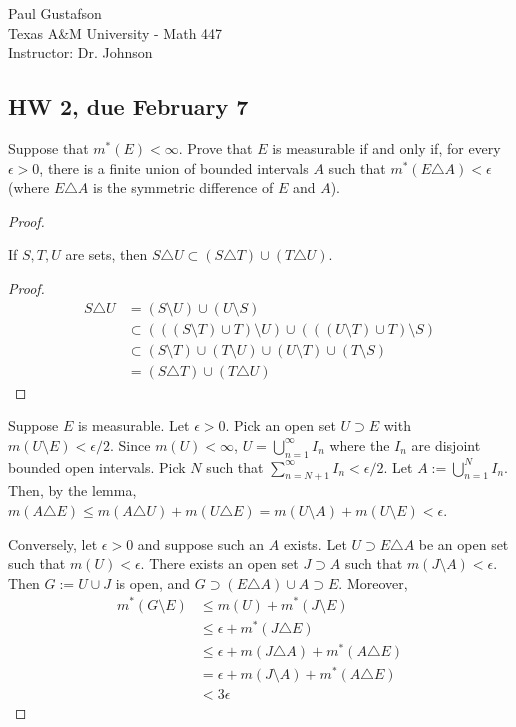 \documentclass{article}
\begin{document}
\noindent Paul Gustafson\\
\noindent Texas A\&M University - Math 447\\ 
\noindent Instructor: Dr. Johnson

\subsection*{HW 2, due February 7}
 Suppose that $m^*(E) < \infty$. Prove that $E$ is measurable if and only if, for every $\epsilon > 0$, there is a finite union of bounded intervals $A$ such that $m^*(E\triangle A) < \epsilon$ (where $E\triangle A$ is the symmetric difference of $E$ and $A$).
\begin{proof}
\begin{lemma}\label{lem1}
If $S,T,U$ are sets, then $S\triangle U \subset (S\triangle T) \cup (T\triangle U)$.
\end{lemma}
\begin{proof}
\begin{align*} 
S \triangle U & = (S\setminus U) \cup (U \setminus S) \\
& \subset  (((S \setminus T) \cup T) \setminus U) \cup (((U \setminus T) \cup T) \setminus S) \\
&\subset  (S \setminus T) \cup (T \setminus U) \cup (U \setminus T) \cup (T \setminus S) \\
& =  (S\triangle T) \cup (T\triangle U)
\end{align*}
\end{proof}

Suppose $E$ is measurable. Let $\epsilon > 0$. Pick an open set $U \supset E$ with $m(U \setminus E) < \epsilon/2$. Since $m(U) < \infty$, $U = \bigcup_{n=1}^\infty I_n$ where the $I_n$ are disjoint bounded open intervals.  Pick $N$ such that $\sum_{n=N+1}^\infty I_n < \epsilon/2$. Let $A := \bigcup_{n=1}^N I_n$. Then, by the lemma, $m(A \triangle E) \le m(A \triangle U) + m(U \triangle E)  = m(U \setminus A) + m(U\setminus E) < \epsilon$.

Conversely, let $\epsilon > 0$ and suppose such an $A$ exists. Let $U \supset E\triangle A$ be an open set such that $m(U) < \epsilon$. There exists an open set $J\supset A$ such that $m(J\setminus A) < \epsilon$. Then $G := U \cup J$ is open, and $G \supset (E\triangle A) \cup A \supset E$. Moreover, 
\begin{align*}
m^*(G \setminus E) & \leq  m(U) + m^*(J \setminus E) 
\\ & \le \epsilon + m^*(J \triangle E)
\\ & \le \epsilon + m(J \triangle A) + m^*(A \triangle E)
\\ & = \epsilon + m(J \setminus A) + m^*(A \triangle E)
\\ & < 3\epsilon
\end{align*}
\end{proof}
\end{document}
